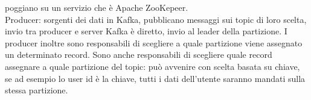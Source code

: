 \documentclass[16px]{article}
\begin{document}
poggiano su un servizio che è Apache ZooKepeer.\\ Producer: sorgenti dei dati in Kafka, pubblicano messaggi sui topic di loro scelta, invio tra producer e server Kafka è diretto, invio al leader della partizione. I producer inoltre sono responsabili di scegliere a quale partizione viene assegnato un determinato record. Sono anche responsabili di scegliere quale record assegnare a quale partizione del topic: può avvenire con scelta basata su chiave, se ad esempio lo user id è la chiave, tutti i dati dell'utente saranno mandati sulla stessa partizione.
\end{document}
